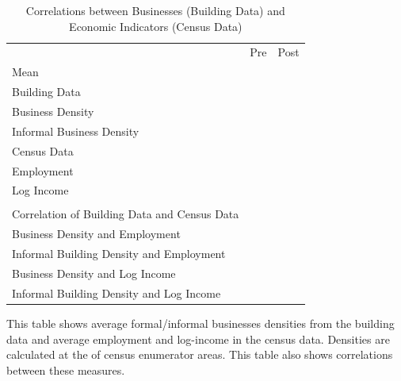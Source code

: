 \documentclass[12pt]{article}
\begin{document}
\begin{table}[ht!]
\small
\centering
\caption{Correlations between Businesses (Building Data) and Economic Indicators (Census Data)  }\label{table:empcorr}
\vspace{-2mm}
\begin{threeparttable}
\begin{tabular}{lCC}
\toprule
 &Pre & Post \\
Mean &  & \\
\midrule
Building Data  \\
\hspace{1cm} Business Density&  &  \\
\hspace{1cm} Informal Business Density &  &  \\
Census Data  \\
\hspace{1cm} Employment &  &  \\
\hspace{1cm} Log Income &  &  \\
\\
Correlation of Building Data and Census Data \\
\midrule
\hspace{1cm} Business Density and Employment &  &  \\
\hspace{1cm} Informal Building Density and Employment &  &  \\
\hspace{1cm} Business Density and Log Income &  &  \\
\hspace{1cm} Informal Building Density and Log Income &  &  \\
\bottomrule
\end{tabular}
\begin{tablenotes}
\item \footnotesize 
 This table shows average formal/informal businesses densities from the building data and average employment and log-income in the census data.  Densities are calculated at the of census enumerator areas. This table also shows correlations between these measures.
\end{tablenotes}
\end{threeparttable}
\end{table}
\end{document}
